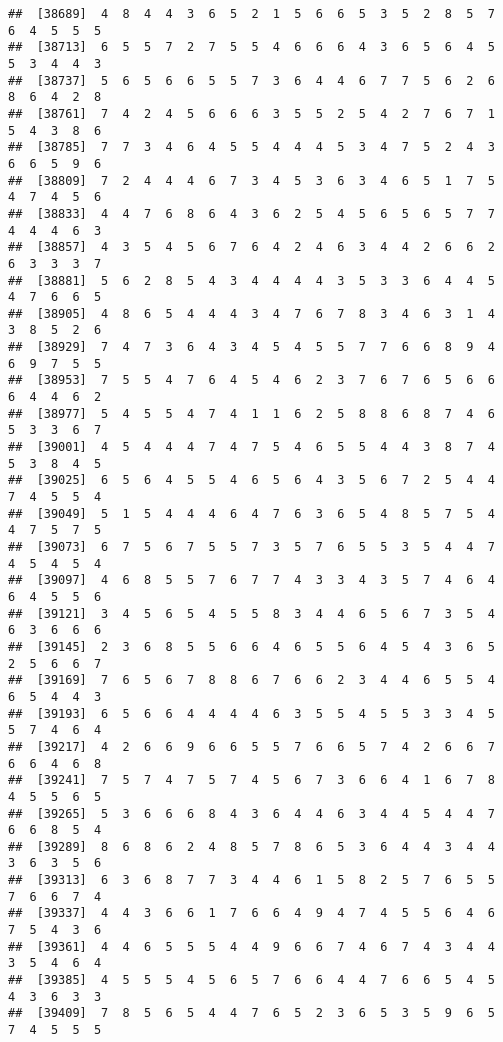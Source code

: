 \documentclass[
]{book}
\begin{document}
\begin{verbatim}
##  [38689]  4  8  4  4  3  6  5  2  1  5  6  6  5  3  5  2  8  5  7  6  4  5  5  5
##  [38713]  6  5  5  7  2  7  5  5  4  6  6  6  4  3  6  5  6  4  5  5  3  4  4  3
##  [38737]  5  6  5  6  6  5  5  7  3  6  4  4  6  7  7  5  6  2  6  8  6  4  2  8
##  [38761]  7  4  2  4  5  6  6  6  3  5  5  2  5  4  2  7  6  7  1  5  4  3  8  6
##  [38785]  7  7  3  4  6  4  5  5  4  4  4  5  3  4  7  5  2  4  3  6  6  5  9  6
##  [38809]  7  2  4  4  4  6  7  3  4  5  3  6  3  4  6  5  1  7  5  4  7  4  5  6
##  [38833]  4  4  7  6  8  6  4  3  6  2  5  4  5  6  5  6  5  7  7  4  4  4  6  3
##  [38857]  4  3  5  4  5  6  7  6  4  2  4  6  3  4  4  2  6  6  2  6  3  3  3  7
##  [38881]  5  6  2  8  5  4  3  4  4  4  4  3  5  3  3  6  4  4  5  4  7  6  6  5
##  [38905]  4  8  6  5  4  4  4  3  4  7  6  7  8  3  4  6  3  1  4  3  8  5  2  6
##  [38929]  7  4  7  3  6  4  3  4  5  4  5  5  7  7  6  6  8  9  4  6  9  7  5  5
##  [38953]  7  5  5  4  7  6  4  5  4  6  2  3  7  6  7  6  5  6  6  6  4  4  6  2
##  [38977]  5  4  5  5  4  7  4  1  1  6  2  5  8  8  6  8  7  4  6  5  3  3  6  7
##  [39001]  4  5  4  4  4  7  4  7  5  4  6  5  5  4  4  3  8  7  4  5  3  8  4  5
##  [39025]  6  5  6  4  5  5  4  6  5  6  4  3  5  6  7  2  5  4  4  7  4  5  5  4
##  [39049]  5  1  5  4  4  4  6  4  7  6  3  6  5  4  8  5  7  5  4  4  7  5  7  5
##  [39073]  6  7  5  6  7  5  5  7  3  5  7  6  5  5  3  5  4  4  7  4  5  4  5  4
##  [39097]  4  6  8  5  5  7  6  7  7  4  3  3  4  3  5  7  4  6  4  6  4  5  5  6
##  [39121]  3  4  5  6  5  4  5  5  8  3  4  4  6  5  6  7  3  5  4  6  3  6  6  6
##  [39145]  2  3  6  8  5  5  6  6  4  6  5  5  6  4  5  4  3  6  5  2  5  6  6  7
##  [39169]  7  6  5  6  7  8  8  6  7  6  6  2  3  4  4  6  5  5  4  6  5  4  4  3
##  [39193]  6  5  6  6  4  4  4  4  6  3  5  5  4  5  5  3  3  4  5  5  7  4  6  4
##  [39217]  4  2  6  6  9  6  6  5  5  7  6  6  5  7  4  2  6  6  7  6  6  4  6  8
##  [39241]  7  5  7  4  7  5  7  4  5  6  7  3  6  6  4  1  6  7  8  4  5  5  6  5
##  [39265]  5  3  6  6  6  8  4  3  6  4  4  6  3  4  4  5  4  4  7  6  6  8  5  4
##  [39289]  8  6  8  6  2  4  8  5  7  8  6  5  3  6  4  4  3  4  4  3  6  3  5  6
##  [39313]  6  3  6  8  7  7  3  4  4  6  1  5  8  2  5  7  6  5  5  7  6  6  7  4
##  [39337]  4  4  3  6  6  1  7  6  6  4  9  4  7  4  5  5  6  4  6  7  5  4  3  6
##  [39361]  4  4  6  5  5  5  4  4  9  6  6  7  4  6  7  4  3  4  4  3  5  4  6  4
##  [39385]  4  5  5  5  4  5  6  5  7  6  6  4  4  7  6  6  5  4  5  4  3  6  3  3
##  [39409]  7  8  5  6  5  4  4  7  6  5  2  3  6  5  3  5  9  6  5  7  4  5  5  5

\end{verbatim}
\end{document}
